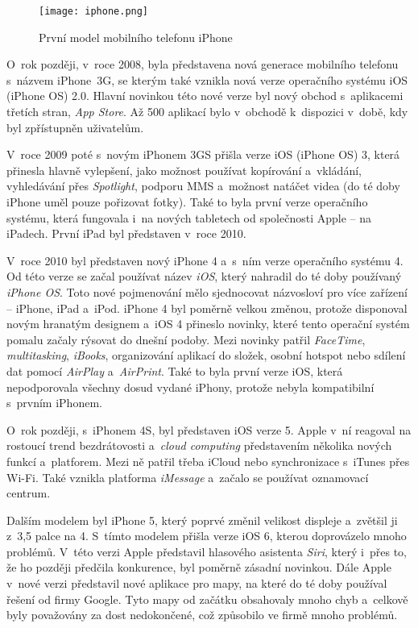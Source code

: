 \begin{figure}[h]
	\centering
	\texttt{[image: iphone.png]}
	\caption{První model mobilního telefonu iPhone \cite{iphone-review}}
\end{figure}

O~rok později, v~roce 2008, byla představena nová generace mobilního telefonu s~názvem iPhone~3G, se kterým také vznikla nová verze operačního systému iOS (iPhone OS) 2.0. Hlavní novinkou této nové verze byl nový obchod s~aplikacemi třetích stran, \emph{App Store}. Až 500 aplikací bylo v~obchodě k~dispozici v~době, kdy byl zpřístupněn uživatelům.

V~roce 2009 poté s~novým iPhonem 3GS přišla verze iOS (iPhone OS) 3, která přinesla hlavně vylepšení, jako možnost používat kopírování a~vkládání, vyhledávání přes \emph{Spotlight}, podporu MMS a~možnost natáčet videa (do té doby iPhone uměl pouze pořizovat fotky). Také to byla první verze operačního systému, která fungovala i~na nových tabletech od společnosti Apple – na iPadech. První iPad byl představen v~roce 2010.

V~roce 2010 byl představen nový iPhone 4 a~s~ním verze operačního systému 4. Od této verze se začal používat název \emph{iOS}, který nahradil do té doby používaný \emph{iPhone OS}. Toto nové pojmenování mělo sjednocovat názvosloví pro více zařízení – iPhone, iPad a~iPod. iPhone 4 byl poměrně velkou změnou, protože disponoval novým hranatým designem a~iOS 4 přineslo novinky, které tento operační systém pomalu začaly rýsovat do dnešní podoby. Mezi novinky patřil \emph{FaceTime}, \emph{multitasking}, \emph{iBooks}, organizování aplikací do složek, osobní hotspot nebo sdílení dat pomocí \emph{AirPlay} a~\emph{AirPrint}. Také to byla první verze iOS, která nepodporovala všechny dosud vydané iPhony, protože nebyla kompatibilní s~prvním iPhonem.

O~rok později, s~iPhonem 4S, byl představen iOS verze 5. Apple v~ní reagoval na rostoucí trend bezdrátovosti a~\emph{cloud computing} představením několika nových funkcí a~platforem. Mezi ně patřil třeba iCloud nebo synchronizace s~iTunes přes Wi-Fi. Také vznikla platforma \emph{iMessage} a~začalo se používat oznamovací centrum.

Dalším modelem byl iPhone 5, který poprvé změnil velikost displeje a~zvětšil ji z~3,5 palce na 4. S~tímto modelem přišla verze iOS 6, kterou doprovázelo mnoho problémů. V~této verzi Apple představil hlasového asistenta \emph{Siri}, který i~přes to, že ho později předčila konkurence, byl poměrně zásadní novinkou. Dále Apple v~nové verzi představil nové aplikace pro mapy, na které do té doby používal řešení od firmy Google. Tyto mapy od začátku obsahovaly mnoho chyb a~celkově byly považovány za dost nedokončené, což způsobilo ve firmě mnoho problémů.

